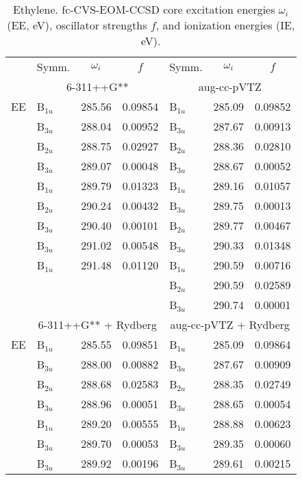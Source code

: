 \documentclass[journal=jctcce,manuscript=article]{achemso}
\begin{document}
\begin{table}
\small
\caption{Ethylene. fc-CVS-EOM-CCSD core excitation energies $\omega_i$ (EE, eV), oscillator strengths $f$, and
  ionization energies (IE, eV). \label{Tab:Ethylene} }
\scriptsize
\begin{tabular}{l|lcc|lcc}
\cline{2-7}
& Symm. & $\omega_i$ & $f$ & Symm. & $\omega_i$ & $f$ \\
\cline{2-7}
  & \multicolumn{3}{c|}{6-311++G**}
          & \multicolumn{3}{c}{aug-cc-pVTZ} \\
\hline
  EE 
& B$_{1u}$ & 285.56 & 0.09854        & B$_{1u}$ & 285.09 & 0.09852 \\
& B$_{3u}$ & 288.04 & 0.00952        & B$_{3u}$ & 287.67 & 0.00913 \\
& B$_{2u}$ & 288.75 & 0.02927        & B$_{2u}$ & 288.36 & 0.02810 \\
& B$_{3u}$ & 289.07 & 0.00048        & B$_{3u}$ & 288.67 & 0.00052 \\
& B$_{1u}$ & 289.79 & 0.01323        & B$_{1u}$ & 289.16 & 0.01057 \\
& B$_{2u}$ & 290.24 & 0.00432        & B$_{3u}$ & 289.75 & 0.00013 \\
& B$_{3u}$ & 290.40 & 0.00101        & B$_{2u}$ & 289.77 & 0.00467 \\
& B$_{3u}$ & 291.02 & 0.00548        & B$_{3u}$ & 290.33 & 0.01348 \\
& B$_{1u}$ & 291.48 & 0.01120        & B$_{1u}$ & 290.59 & 0.00716 \\
& & &         & B$_{2u}$ & 290.59 & 0.02589 \\
& & &         & B$_{3u}$ & 290.74 & 0.00001 \\
\cline{2-7}
      & \multicolumn{3}{c|}{6-311++G** + Rydberg}
      & \multicolumn{3}{c}{aug-cc-pVTZ + Rydberg} }\\
\hline
  EE 
& B$_{1u}$ & 285.55 & 0.09851    & B$_{1u}$ & 285.09 & 0.09864 \\
& B$_{3u}$ & 288.00 & 0.00882    & B$_{3u}$ & 287.67 & 0.00909 \\
& B$_{2u}$ & 288.68 & 0.02583    & B$_{2u}$ & 288.35 & 0.02749 \\
& B$_{3u}$ & 288.96 & 0.00051    & B$_{3u}$ & 288.65 & 0.00054 \\
& B$_{1u}$ & 289.20 & 0.00555    & B$_{1u}$ & 288.88 & 0.00623 \\
& B$_{3u}$ & 289.70 & 0.00053    & B$_{3u}$ & 289.35 & 0.00060 \\
& B$_{3u}$ & 289.92 & 0.00196    & B$_{3u}$ & 289.61 & 0.00215 \\

\end{tabular}
\end{table}
\end{document}
